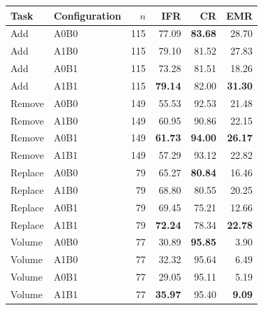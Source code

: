 \begin{tabular}{llrrrr}
\toprule
Task & Configuration & $n$ & IFR & CR & EMR \\
\midrule
Add & A0B0 & 115 & 77.09 & \textbf{83.68} & 28.70 \\
Add & A1B0 & 115 & 79.10 & 81.52 & 27.83 \\
Add & A0B1 & 115 & 73.28 & 81.51 & 18.26 \\
Add & A1B1 & 115 & \textbf{79.14} & 82.00 & \textbf{31.30} \\
Remove & A0B0 & 149 & 55.53 & 92.53 & 21.48 \\
Remove & A1B0 & 149 & 60.95 & 90.86 & 22.15 \\
Remove & A0B1 & 149 & \textbf{61.73} & \textbf{94.00} & \textbf{26.17} \\
Remove & A1B1 & 149 & 57.29 & 93.12 & 22.82 \\
Replace & A0B0 & 79 & 65.27 & \textbf{80.84} & 16.46 \\
Replace & A1B0 & 79 & 68.80 & 80.55 & 20.25 \\
Replace & A0B1 & 79 & 69.45 & 75.21 & 12.66 \\
Replace & A1B1 & 79 & \textbf{72.24} & 78.34 & \textbf{22.78} \\
Volume & A0B0 & 77 & 30.89 & \textbf{95.85} & 3.90 \\
Volume & A1B0 & 77 & 32.32 & 95.64 & 6.49 \\
Volume & A0B1 & 77 & 29.05 & 95.11 & 5.19 \\
Volume & A1B1 & 77 & \textbf{35.97} & 95.40 & \textbf{9.09} \\
\bottomrule
\end{tabular}
